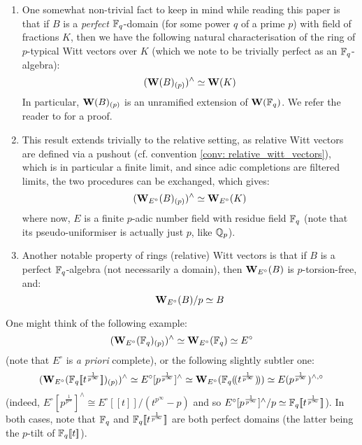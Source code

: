                 \begin{remark} \label{remark: witt_vectors_over_perfect_rings}
                    \noindent
                    \begin{enumerate}
                        \item One somewhat non-trivial fact to keep in mind while reading this paper is that if $B$ is a \textit{perfect} $\mathbb{F}_q$-domain (for some power $q$ of a prime $p$) with field of fractions $K$, then we have the following natural characterisation of the ring of $p$-typical Witt vectors over $K$ (which we note to be trivially perfect as an $\mathbb{F}_q$-algebra):
                        $$(\mathbf{W}(B)_{(p)})^{\wedge} \simeq \mathbf{W}(K)$$
                        In particular, $\mathbf{W}(B)_{(p)}$ is an unramified extension of $\mathbf{W}(\mathbb{F}_q)$. We refer the reader to \cite[Proposition 5.2]{shimomoto2014witt} for a proof.
                        \item This result extends trivially to the relative setting, as relative Witt vectors are defined via a pushout (cf. convention \ref{conv: relative_witt_vectors}), which is in particular a finite limit, and since adic completions are filtered limits, the two procedures can be exchanged, which gives:
                            $$(\mathbf{W}_{E^{\circ}}(B)_{(p)})^{\wedge} \simeq \mathbf{W}_{E^{\circ}}(K)$$
                        where now, $E$ is a finite $p$-adic number field with residue field $\mathbb{F}_q$ (note that its pseudo-uniformiser is actually just $p$, like $\mathbb{Q}_p$).
                        \item Another notable property of rings (relative) Witt vectors is that if $B$ is a perfect $\mathbb{F}_q$-algebra (not necessarily a domain), then $\mathbf{W}_{E^{\circ}}(B)$ is $p$-torsion-free, and:
                            $$\mathbf{W}_{E^{\circ}}(B)/p \simeq B$$
                    \end{enumerate}
                \end{remark}
                \begin{example}
                    One might think of the following example:
                        $$(\mathbf{W}_{E^{\circ}}(\mathbb{F}_q)_{(p)})^{\wedge} \simeq \mathbf{W}_{E^{\circ}}(\mathbb{F}_q) \simeq E^{\circ}$$
                    (note that $E^{\circ}$ is \textit{a priori} complete), or the following slightly subtler one:
                        $$( \mathbf{W}_{E^{\circ}}( \mathbb{F}_q[\![t^{\frac{1}{p^{\infty}}}]\!] )_{(p)} )^{\wedge} \simeq E^{\circ}[p^{\frac{1}{p^{\infty}}}]^{\wedge} \simeq \mathbf{W}_{E^{\circ}}( \mathbb{F}_q(\!(t^{\frac{1}{p^{\infty}}})\!) ) \simeq E(p^{\frac{1}{p^{\infty}}})^{\wedge, \circ}$$
                    (indeed, $E^{\circ}[p^{\frac{1}{p^{\infty}}}]^{\wedge} \cong E^{\circ}[\![t]\!]/(t^{p^{\infty}} - p)$ and so $E^{\circ}[p^{\frac{1}{p^{\infty}}}]^{\wedge}/p \simeq \mathbb{F}_q[\![t^{\frac{1}{p^{\infty}}}]\!]$). In both cases, note that $\mathbb{F}_q$ and $\mathbb{F}_q[\![t^{\frac{1}{p^{\infty}}}]\!]$ are both perfect domains (the latter being the $p$-tilt of $\mathbb{F}_q[\![t]\!]$).
                \end{example}
                
